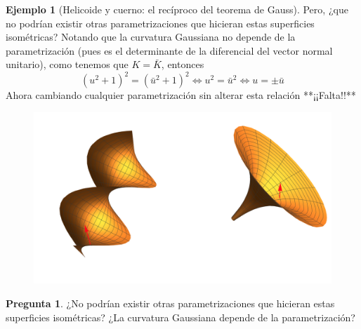\documentclass[spanish]{book}
\theoremstyle{definition}
\newtheorem*{ejem}{Ejemplo}
\newtheorem*{pregunta}{Pregunta}
\begin{document}
\begin{ejem}[Helicoide y cuerno: el recíproco del teorema de Gauss]
	Pero, ¿que no podrían existir otras parametrizaciones que hicieran estas superficies isométricas? Notando que la curvatura Gaussiana no depende de la parametrización (pues es el determinante de la diferencial del vector normal unitario), como tenemos que $K=\bar{K}$, entonces
	\[(u^2+1)^2=(\bar u^2+1)^2\iff u^2=\bar u^2\iff  u=\pm\bar u\]
	Ahora cambiando cualquier parametrización sin alterar esta relación **¡¡Falta!!**
	\begin{figure}[H]
		\centering
		\includegraphics[width=\linewidth]{gauss4}
	\end{figure}
	\vspace{-1cm}
\end{ejem}
\begin{pregunta}
	¿No podrían existir otras parametrizaciones que hicieran estas superficies isométricas? ¿La curvatura Gaussiana depende de la parametrización?
\end{pregunta}
\end{document}
